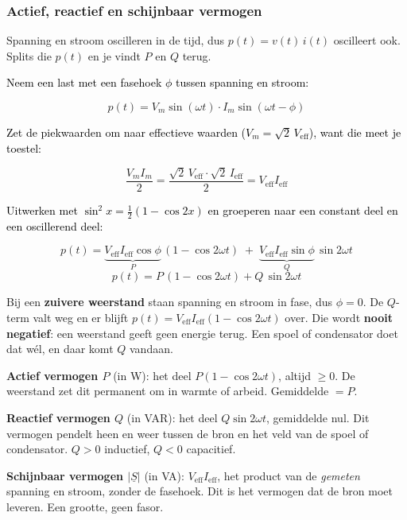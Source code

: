 \documentclass[a4paper,11pt]{article}
\newcommand{\stapreden}[1]{\par\vspace{1.4mm}\noindent\textcolor{black}{#1}\par\vspace{-2mm}}
\begin{document}
\subsubsection{Actief, reactief en schijnbaar vermogen}

Spanning en stroom oscilleren in de tijd, dus $p(t) = v(t)\,i(t)$ oscilleert ook. Splits die
$p(t)$ en je vindt $P$ en $Q$ terug.

\stapreden{Neem een last met een fasehoek $\phi$ tussen spanning en stroom:}
\[p(t) = V_m \sin(\omega t)\cdot I_m \sin(\omega t - \phi)\]

\stapreden{Zet de piekwaarden om naar effectieve waarden ($V_m = \sqrt2\,V_{\text{eff}}$), want die
    meet je toestel:}
\[\frac{V_m I_m}{2} = \frac{\sqrt2\,V_{\text{eff}}\cdot\sqrt2\,I_{\text{eff}}}{2}
    = V_{\text{eff}} I_{\text{eff}}\]

\stapreden{Uitwerken met $\sin^2 x = \tfrac12(1-\cos 2x)$ en groeperen naar een constant deel en een
    oscillerend deel:}
\[p(t) = \underbrace{V_{\text{eff}} I_{\text{eff}} \cos\phi}_{P}\,(1 - \cos 2\omega t)
    \;+\; \underbrace{V_{\text{eff}} I_{\text{eff}} \sin\phi}_{Q}\,\sin 2\omega t\]
\[\boxed{p(t) = P\,(1 - \cos 2\omega t) + Q\,\sin 2\omega t}\]

Bij een \textbf{zuivere weerstand} staan spanning en stroom in fase, dus $\phi = 0$. De $Q$-term valt
weg en er blijft $p(t) = V_{\text{eff}} I_{\text{eff}}(1 - \cos 2\omega t)$ over. Die wordt
\textbf{nooit negatief}: een weerstand geeft geen energie terug. Een spoel of condensator doet dat
w\'el, en daar komt $Q$ vandaan.

\begin{conceptbox}
    \textbf{Actief vermogen $P$} (in W): het deel $P(1-\cos 2\omega t)$, altijd $\ge 0$. De weerstand
    zet dit permanent om in warmte of arbeid. Gemiddelde $= P$.

    \textbf{Reactief vermogen $Q$} (in VAR): het deel $Q\sin 2\omega t$, gemiddelde nul. Dit vermogen
    pendelt heen en weer tussen de bron en het veld van de spoel of condensator. $Q > 0$ inductief,
    $Q < 0$ capacitief.

    \textbf{Schijnbaar vermogen $|\underline{S}|$} (in VA): $V_{\text{eff}} I_{\text{eff}}$, het
    product van de \emph{gemeten} spanning en stroom, zonder de fasehoek. Dit is het vermogen dat de
    bron moet leveren. Een grootte, geen fasor.
\end{conceptbox}

\end{document}
